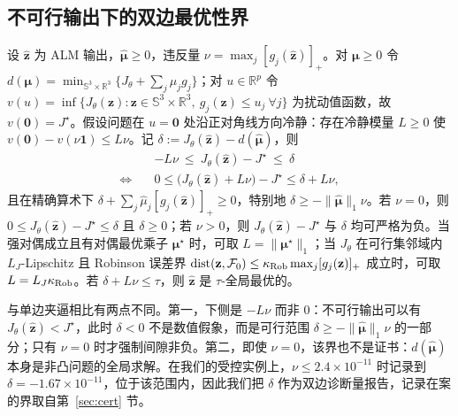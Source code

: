 \subsection{不可行输出下的双边最优性界}\label{sec:conditional}
\begin{theorem}[基于冷静性的双边界]\label{thm:cond}
设 $\hat{\mathbf z}$ 为 ALM 输出，$\hat{\boldsymbol\mu}\ge0$，违反量 $\nu=\max_j[g_j(\hat{\mathbf z})]_+$。对 $\boldsymbol\mu\ge0$ 令 $d(\boldsymbol\mu)=\min_{\mathbb{S}^3\times\mathbb{R}^3}\{J_\theta+\sum_j\mu_jg_j\}$；对 $u\in\mathbb{R}^p$ 令 $v(u)=\inf\{J_\theta(\mathbf z):\mathbf z\in\mathbb{S}^3\times\mathbb{R}^3,\ g_j(\mathbf z)\le u_j\ \forall j\}$ 为扰动值函数，故 $v(\mathbf 0)=J^\star$。假设问题在 $u=\mathbf 0$ 处沿正对角线方向冷静：存在冷静模量 $L\ge0$ 使 $v(\mathbf 0)-v(\nu\mathbf 1)\le L\nu$。记 $\delta:=J_\theta(\hat{\mathbf z})-d(\hat{\boldsymbol\mu})$，则
\begin{equation}
\begin{aligned}
&-L\nu\ \le\ J_\theta(\hat{\mathbf z})-J^\star\ \le\ \delta\\
\Longleftrightarrow\quad &0\le\big(J_\theta(\hat{\mathbf z})+L\nu\big)-J^\star\le\delta+L\nu,
\end{aligned}
\label{eq:sandwich}
\end{equation}
且在精确算术下 $\delta+\sum_j\hat\mu_j[g_j(\hat{\mathbf z})]_+\ge0$，特别地 $\delta\ge-\|\hat{\boldsymbol\mu}\|_1\nu$。若 $\nu=0$，则 $0\le J_\theta(\hat{\mathbf z})-J^\star\le\delta$ 且 $\delta\ge0$；若 $\nu>0$，则 $J_\theta(\hat{\mathbf z})-J^\star$ 与 $\delta$ 均可严格为负。当强对偶成立且有对偶最优乘子 $\boldsymbol\mu^\star$ 时，可取 $L=\|\boldsymbol\mu^\star\|_1$；当 $J_\theta$ 在可行集邻域内 $L_J$-Lipschitz 且 Robinson 误差界 $\operatorname{dist}(\mathbf z,\mathcal F_0)\le\kappa_{\rm Rob}\max_j[g_j(\mathbf z)]_+$ 成立时，可取 $L=L_J\kappa_{\rm Rob}$。若 $\delta+L\nu\le\tau$，则 $\hat{\mathbf z}$ 是 $\tau$-全局最优的。
\end{theorem}
与单边夹逼相比有两点不同。第一，下侧是 $-L\nu$ 而非 $0$：不可行输出可以有 $J_\theta(\hat{\mathbf z})<J^\star$，此时 $\delta<0$ 不是数值假象，而是可行范围 $\delta\ge-\|\hat{\boldsymbol\mu}\|_1\nu$ 的一部分；只有 $\nu=0$ 时才强制间隙非负。第二，即使 $\nu=0$，该界也不是证书：$d(\hat{\boldsymbol\mu})$ 本身是非凸问题的全局求解。在我们的受控实例上，$\nu\le2.4\times10^{-11}$ 时记录到 $\delta=-1.67\times10^{-11}$，位于该范围内，因此我们把 $\delta$ 作为双边诊断量报告，记录在案的界取自第~\ref{sec:cert} 节。

